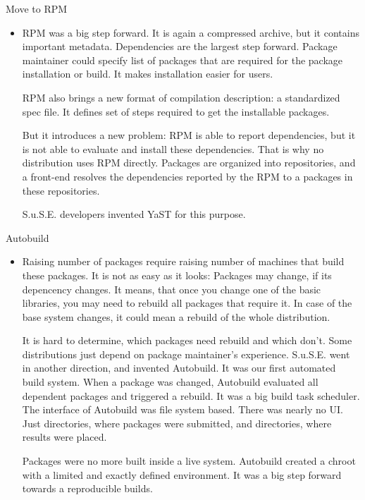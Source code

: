 \documentclass{beamer}
\begin{document}
\begin{frame}[t]{Move to RPM}
	\begin{itemize}
	\item RPM was a big step forward. It is again a compressed archive, but it contains important metadata. Dependencies are the largest step forward. Package maintainer could specify list of packages that are required for the package installation or build. It makes installation easier for users.
	
	RPM also brings a new format of compilation description: a standardized spec file. It defines set of steps required to get the installable packages.
	
	But it introduces a new problem: RPM is able to report dependencies, but it is not able to evaluate and install these dependencies. That is why no distribution uses RPM directly. Packages are organized into repositories, and a front-end resolves the dependencies reported by the RPM to a packages in these repositories.
	
	S.u.S.E. developers invented YaST for this purpose.
	\end{itemize}
\end{frame}

\begin{frame}[t]{Autobuild}
	\begin{itemize}
	\item Raising number of packages require raising number of machines that build these packages. It is not as easy as it looks: Packages may change, if its depencency changes. It means, that once you change one of the basic libraries, you may need to rebuild all packages that require it. In case of the base system changes, it could mean a rebuild of the whole distribution.
	
	It is hard to determine, which packages need rebuild and which don't. Some distributions just depend on package maintainer's experience. S.u.S.E. went in another direction, and invented Autobuild. It was our first automated build system. When a package was changed, Autobuild evaluated all dependent packages and triggered a rebuild. It was a big build task scheduler. The interface of Autobuild was file system based. There was nearly no UI. Just directories, where packages were submitted, and directories, where results were placed.
	
	Packages were no more built inside a live system. Autobuild created a chroot with a limited and exactly defined environment. It was a big step forward towards a reproducible builds.
	\end{itemize}
\end{frame}
\end{document}
